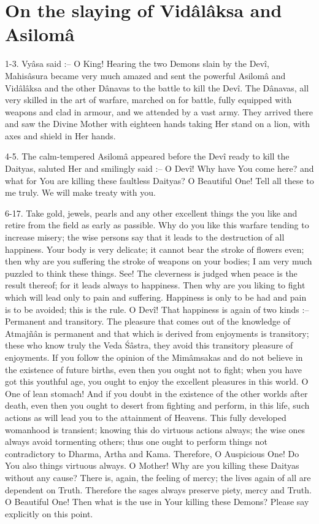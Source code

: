 ﻿\chapter{On the slaying of Vid\^al\^aksa and Asilom\^a}

1-3. Vy\^asa said :-- O King! Hearing the two Demons slain by the Dev\^i, Mahis\^asura became very much amazed and sent the powerful Asilom\^a and Vid\^al\^aksa and the other D\^anavas to the battle to kill the Dev\^i. The D\^anavas, all very skilled in the art of warfare, marched on for battle, fully equipped with weapons and clad in armour, and we attended by a vast army. They arrived there and saw the Divine Mother with eighteen hands taking Her stand on a lion, with axes and shield in Her hands.

4-5. The calm-tempered Asilom\^a appeared before the Dev\^i ready to kill the Daityas, saluted Her and smilingly said :-- O Dev\^i! Why have You come here? and what for You are killing these faultless Daityas? O Beautiful One! Tell all these to me truly. We will make treaty with you.

6-17. Take gold, jewels, pearls and any other excellent things the you like and retire from the field as early as passible. Why do you like this warfare tending to increase misery; the wise persons say that it leads to the destruction of all happiness. Your body is very delicate; it cannot bear the stroke of flowers even; then why are you suffering the stroke of weapons on your bodies; I am very much puzzled to think these things. See! The cleverness is judged when peace is the result thereof; for it leads always to happiness. Then why are you liking to fight which will lead only to pain and suffering. Happiness is only to be had and pain is to be avoided; this is the rule. O Dev\^i! That happiness is again of two kinds :-- Permanent and transitory. The pleasure that comes out of the knowledge of Atmajñ\^an is permanent and that which is derived from enjoyments is transitory; these who know truly the Veda \'S\^astra, they avoid this transitory pleasure of enjoyments. If you follow the opinion of the Mim\^amsakas and do not believe in the existence of future births, even then you ought not to fight; when you have got this youthful age, you ought to enjoy the excellent pleasures in this world. O One of lean stomach! And if you doubt in the existence of the other worlds after death, even then you ought to desert from fighting and perform, in this life, such actions as will lead you to the attainment of Heavens. This fully developed womanhood is transient; knowing this do virtuous actions always; the wise ones always avoid tormenting others; thus one ought to perform things not contradictory to Dharma, Artha and Kama. Therefore, O Auspicious One! Do You also things virtuous always. O Mother! Why are you killing these Daityas without any cause? There is, again, the feeling of mercy; the lives again of all are dependent on Truth. Therefore the sages always preserve piety, mercy and Truth. O Beautiful One! Then what is the use in Your killing these Demons? Please say explicitly on this point.

